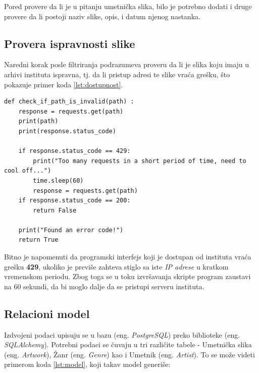 \documentclass[12pt,oneside]{memoir}
\begin{document}
Pored provere da li je u pitanju umetnička slika, bilo je potrebno dodati i druge provere da li postoji 
naziv slike, opis, i datum njenog nastanka. 

\subsection{Provera ispravnosti slike}

Naredni korak posle filtriranja podrazumeva proveru da li je slika koju imaju u arhivi instituta ispravna, tj. 
da li pristup adresi te slike vraća grešku, što pokazuje primer koda \ref{lst:dostupnost}.
\newline

\begin{lstlisting}
def check_if_path_is_invalid(path) :
    response = requests.get(path)
    print(path)
    print(response.status_code)

    if response.status_code == 429:
        print("Too many requests in a short period of time, need to cool off...")
        time.sleep(60)
        response = requests.get(path)
    if response.status_code == 200:
        return False

    print("Found an error code!")
    return True
\end{lstlisting}


Bitno je napomenuti da programski interfejs koji je dostupan od instituta vraća grešku \textbf{429}, ukoliko je 
previše zahteva stiglo sa iste \textit{IP adrese} u kratkom vremenskom periodu. Zbog toga se u toku izvršavanja 
skripte program zaustavi na 60 sekundi, da bi moglo dalje da se pristupi serveru instituta. 


\subsection{Relacioni model} 

Izdvojeni podaci upisuju se u bazu (eng. \textit{PostgreSQL}) preko biblioteke (eng. \textit{SQLAlchemy}).
Potrebni podaci se čuvaju u tri različite tabele - Umetnička slika (eng. \textit{Artwork}), Žanr (eng. \textit{Genre})
kao i Umetnik (eng. \textit{Artist}). To se može videti primerom koda \ref{lst:model}, koji takav model generiše:
\end{document}
